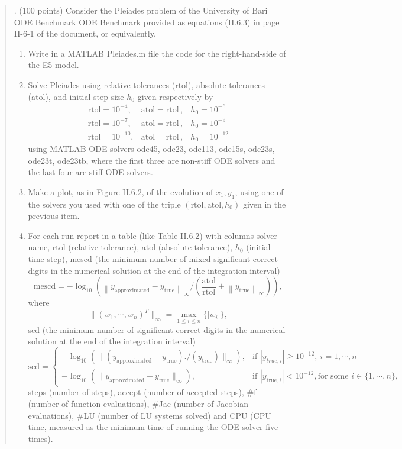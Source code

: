 \documentclass[11pt]{article}
\begin{document}
\begin{quote}

. (100 points) Consider the Pleiades problem of the University of Bari ODE
Benchmark ODE Benchmark provided as equations (II.6.3) in page II-6-1 of the
document, or equivalently,

\begin{enumerate}
\renewcommand{\labelenumi}{(\alph{enumi})}

\item Write in a MATLAB Pleiades.m file the code for the right-hand-side of the
E5 model.

\item Solve Pleiades using relative tolerances (rtol), absolute tolerances
(atol), and initial step size $h_0$ given respectively by
\[
\begin{array}{lll}
\text{rtol} = 10^{-4},  & \text{atol} = \text{rtol}\,, & h_0 = 10^{-6}\\[0.2em]
\text{rtol} = 10^{-7},  & \text{atol} = \text{rtol}\,, & h_0 = 10^{-9}\\[0.2em]
\text{rtol} = 10^{-10}, & \text{atol} = \text{rtol}\,, & h_0 = 10^{-12}
\end{array}
\]
using MATLAB ODE solvers ode45, ode23, ode113, ode15s, ode23s, ode23t, ode23tb,
where the first three are non-stiff ODE solvers and the last four are stiff ODE
solvers.

\item Make a plot, as in Figure II.6.2, of the evolution of $x_1, y_1$, using one
of the solvers you used with one of the triple $(\text{rtol}, \text{atol}, h_0)$
given in the previous item.

\item For each run report in a table (like Table II.6.2) with columns solver
name, rtol (relative tolerance), atol (absolute tolerance), $h_0$ (initial time
step), mescd (the minimum number of mixed significant correct digits in the
numerical solution at the end of the integration interval)
\[
\text{mescd} = -\log_{10}
\left( \left\lVert y_{\text{approximated}} - y_{\text{true}} \right\rVert_{\infty}
\Big/ \left( \frac{\text{atol}}{\text{rtol}}
+ \left\lVert y_{\text{true}} \right\rVert_{\infty} \right) \right),
\]
where
\[
\lVert (w_1, \cdots, w_n)^{T} \rVert_{\infty} = \max_{1 \leq i \leq n} \{ |w_i| \},
\]
scd (the minimum number of significant correct digits in the numerical solution
at the end of the integration interval)
{\footnotesize
\[
\text{scd} =
\begin{cases}
-\log_{10}\left( \lVert (y_{\text{approximated}} - y_{\text{true}})
 ./ (y_{\text{true}}) \rVert_{\infty} \right), &
\text{if } |y_{true,i}| \geq 10^{-12},\ i = 1, \cdots, n\\[0.9em]
-\log_{10}\left( \lVert y_{\text{approximated}} - y_{\text{true}}
 \rVert_{\infty} \right), &
\text{if } |y_{\text{true},i}| < 10^{-12}, \text{for some } i \in \{1, \cdots, n\},
\end{cases}
\]
}
steps (number of steps), accept (number of accepted steps), \#f (number of
function evaluations), \#Jac (number of Jacobian evaluations), \#LU (number of
LU systems solved) and CPU (CPU time, measured as the minimum time of running
the ODE solver five times).


\end{enumerate}
\end{quote}
\end{document}
